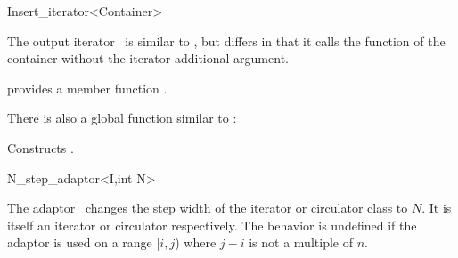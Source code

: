 \begin{ccRefClass}{Insert_iterator<Container>}
  \label{sectionInsertIterator}

  
  \ccDefinition The output iterator \ccClassTemplateName\ is similar
  to , but differs in that it calls the
   function of the container without the iterator
  additional argument.


  \ccIsModel
  
  \ccRequirements {} provides a member function
  .

  \ccCreation

  

  There is also a global function similar to :

  { Constructs . }
  
\end{ccRefClass}

\begin{ccRefClass}{N_step_adaptor<I,int N>}
  
  \ccDefinition The adaptor \ccRefName\ changes the step width of the
  iterator or circulator class  to $N$. It is itself an
  iterator or circulator respectively. The behavior is undefined if
  the adaptor is used on a range [$i,j$) where $j-i$ is not a multiple
  of $n$.
  
  
  \ccCreation
  
  
\end{ccRefClass}

